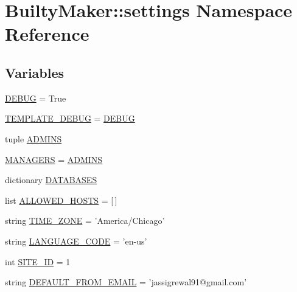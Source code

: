 \hypertarget{namespaceBuiltyMaker_1_1settings}{\section{\-Builty\-Maker\-:\-:settings \-Namespace \-Reference}
\label{namespaceBuiltyMaker_1_1settings}
}
\subsection*{\-Variables}
\begin{DoxyCompactItemize}
\item 
\hyperlink{namespaceBuiltyMaker_1_1settings_a3a883c51d660b16217fd04e4adc616b2}{\-D\-E\-B\-U\-G} = \-True
\item 
\hyperlink{namespaceBuiltyMaker_1_1settings_a5f2a8d94587c2a4bd57514397df997e5}{\-T\-E\-M\-P\-L\-A\-T\-E\-\_\-\-D\-E\-B\-U\-G} = \hyperlink{namespaceBuiltyMaker_1_1settings_a3a883c51d660b16217fd04e4adc616b2}{\-D\-E\-B\-U\-G}
\item 
tuple \hyperlink{namespaceBuiltyMaker_1_1settings_adc8191d016e13a6c9bef1e1476e5c40d}{\-A\-D\-M\-I\-N\-S}
\item 
\hyperlink{namespaceBuiltyMaker_1_1settings_afea6bd5b4b25614d24c57cb213ca7508}{\-M\-A\-N\-A\-G\-E\-R\-S} = \hyperlink{namespaceBuiltyMaker_1_1settings_adc8191d016e13a6c9bef1e1476e5c40d}{\-A\-D\-M\-I\-N\-S}
\item 
dictionary \hyperlink{namespaceBuiltyMaker_1_1settings_a928c50c7ad559c0a8e5b4a1616dd663f}{\-D\-A\-T\-A\-B\-A\-S\-E\-S}
\item 
list \hyperlink{namespaceBuiltyMaker_1_1settings_ab2967a7512f521db1e602c04b48ff353}{\-A\-L\-L\-O\-W\-E\-D\-\_\-\-H\-O\-S\-T\-S} = \mbox{[}$\,$\mbox{]}
\item 
string \hyperlink{namespaceBuiltyMaker_1_1settings_a3cba4c42996704d32bdc29af662176db}{\-T\-I\-M\-E\-\_\-\-Z\-O\-N\-E} = '\-America/\-Chicago'
\item 
string \hyperlink{namespaceBuiltyMaker_1_1settings_a2e7d6b57fcf0b3ef9f49775d80cdcb55}{\-L\-A\-N\-G\-U\-A\-G\-E\-\_\-\-C\-O\-D\-E} = 'en-\/us'
\item 
int \hyperlink{namespaceBuiltyMaker_1_1settings_a1bab8c8e9f5a0c6692dae16a7a27fe5f}{\-S\-I\-T\-E\-\_\-\-I\-D} = 1
\item 
string \hyperlink{namespaceBuiltyMaker_1_1settings_aec414246667020abefe1a622a4d0d6cf}{\-D\-E\-F\-A\-U\-L\-T\-\_\-\-F\-R\-O\-M\-\_\-\-E\-M\-A\-I\-L} = 'jassigrewal91@gmail.\-com'
\item 

\end{DoxyCompactItemize}
